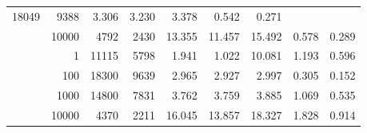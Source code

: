 \begin{table}
\begin{tabular}{rrrrrrrrr}
							     18049  & 9388  
	                           & 3.306 & 3.230 & 3.378
	                           & 0.542 & 0.271  \\
	                
	            
					 &  
					 
					\multirow{ 1 }{*}{ 10000 } &
					
						
							    
							     4792  & 2430  
	                           & 13.355 & 11.457 & 15.492
	                           & 0.578 & 0.289  \\
	                
	            
	        
				\noalign{\smallskip}\hline
				\multirow{ 4 }{*}{ 500000 } &
				
					
					 
					\multirow{ 1 }{*}{ 1 } &
					
						
							    
							     11115  & 5798  
	                           & 1.941 & 1.022 & 10.081
	                           & 1.193 & 0.596  \\
	                
	            
					 &  
					 
					\multirow{ 1 }{*}{ 100 } &
					
						
							    
							     18300  & 9639  
	                           & 2.965 & 2.927 & 2.997
	                           & 0.305 & 0.152  \\
	                
	            
					 &  
					 
					\multirow{ 1 }{*}{ 1000 } &
					
						
							    
							     14800  & 7831  
	                           & 3.762 & 3.759 & 3.885
	                           & 1.069 & 0.535  \\
	                
	            
					 &  
					 
					\multirow{ 1 }{*}{ 10000 } &
					
						
							    
							     4370  & 2211  
	                           & 16.045 & 13.857 & 18.327
	                           & 1.828 & 0.914  \\
	                

\end{tabular}
\end{table}
